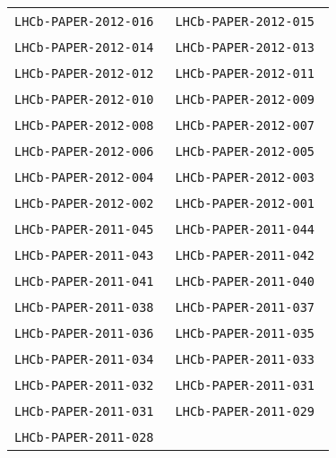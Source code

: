 \begin{center}
\begin{longtable}{ll}
\texttt{LHCb-PAPER-2012-016}~\cite{LHCb-PAPER-2012-016} & 
\texttt{LHCb-PAPER-2012-015}~\cite{LHCb-PAPER-2012-015} \\
\texttt{LHCb-PAPER-2012-014}~\cite{LHCb-PAPER-2012-014} & 
\texttt{LHCb-PAPER-2012-013}~\cite{LHCb-PAPER-2012-013} \\
\texttt{LHCb-PAPER-2012-012}~\cite{LHCb-PAPER-2012-012} & 
\texttt{LHCb-PAPER-2012-011}~\cite{LHCb-PAPER-2012-011} \\
\texttt{LHCb-PAPER-2012-010}~\cite{LHCb-PAPER-2012-010} & 
\texttt{LHCb-PAPER-2012-009}~\cite{LHCb-PAPER-2012-009} \\
\texttt{LHCb-PAPER-2012-008}~\cite{LHCb-PAPER-2012-008} & 
\texttt{LHCb-PAPER-2012-007}~\cite{LHCb-PAPER-2012-007} \\
\texttt{LHCb-PAPER-2012-006}~\cite{LHCb-PAPER-2012-006} & 
\texttt{LHCb-PAPER-2012-005}~\cite{LHCb-PAPER-2012-005} \\
\texttt{LHCb-PAPER-2012-004}~\cite{LHCb-PAPER-2012-004} & 
\texttt{LHCb-PAPER-2012-003}~\cite{LHCb-PAPER-2012-003} \\
\texttt{LHCb-PAPER-2012-002}~\cite{LHCb-PAPER-2012-002} & 
\texttt{LHCb-PAPER-2012-001}~\cite{LHCb-PAPER-2012-001} \\
\hline
\texttt{LHCb-PAPER-2011-045}~\cite{LHCb-PAPER-2011-045} & 
\texttt{LHCb-PAPER-2011-044}~\cite{LHCb-PAPER-2011-044} \\
\texttt{LHCb-PAPER-2011-043}~\cite{LHCb-PAPER-2011-043} & 
\texttt{LHCb-PAPER-2011-042}~\cite{LHCb-PAPER-2011-042} \\
\texttt{LHCb-PAPER-2011-041}~\cite{LHCb-PAPER-2011-041} & 
\texttt{LHCb-PAPER-2011-040}~\cite{LHCb-PAPER-2011-040} \\
\texttt{LHCb-PAPER-2011-038}~\cite{LHCb-PAPER-2011-038} &
\texttt{LHCb-PAPER-2011-037}~\cite{LHCb-PAPER-2011-037} \\
\texttt{LHCb-PAPER-2011-036}~\cite{LHCb-PAPER-2011-036} &
\texttt{LHCb-PAPER-2011-035}~\cite{LHCb-PAPER-2011-035} \\
\texttt{LHCb-PAPER-2011-034}~\cite{LHCb-PAPER-2011-034} &
\texttt{LHCb-PAPER-2011-033}~\cite{LHCb-PAPER-2011-033} \\
\texttt{LHCb-PAPER-2011-032}~\cite{LHCb-PAPER-2011-032} & 
\texttt{LHCb-PAPER-2011-031}~\cite{LHCb-PAPER-2011-031} \\
\texttt{LHCb-PAPER-2011-031}~\cite{LHCb-PAPER-2011-030} &
\texttt{LHCb-PAPER-2011-029}~\cite{LHCb-PAPER-2011-029} \\
\texttt{LHCb-PAPER-2011-028}~\cite{LHCb-PAPER-2011-028} &

\end{longtable}
\end{center}
